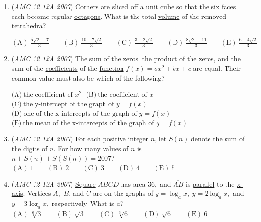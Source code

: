 \begin{enumerate}
 $\mathrm{(A)}\ 282 \qquad \mathrm{(B)}\ 300 \qquad \mathrm{(C)}\ 600 \qquad \mathrm{(D)}\ 900 \qquad \mathrm{(E)}\ 1200$


	\item (\textit{AMC 12 12A 2007}) Corners are sliced off a \href{https://artofproblemsolving.com/wiki/index.php?title=Unit\_cube}{unit cube} so that the six \href{https://artofproblemsolving.com/wiki/index.php?title=Face}{faces} each become regular \href{https://artofproblemsolving.com/wiki/index.php?title=Octagon}{octagons}. What is the total \href{https://artofproblemsolving.com/wiki/index.php?title=Volume}{volume} of the removed \href{https://artofproblemsolving.com/wiki/index.php?title=Tetrahedra}{tetrahedra}?


 $\mathrm{(A)}\ \frac{5\sqrt{2}-7}{3}\qquad \mathrm{(B)}\ \frac{10-7\sqrt{2}}{3}\qquad \mathrm{(C)}\ \frac{3-2\sqrt{2}}{3}\qquad \mathrm{(D)}\ \frac{8\sqrt{2}-11}{3}\qquad \mathrm{(E)}\ \frac{6-4\sqrt{2}}{3}$


	\item (\textit{AMC 12 12A 2007}) The sum of the \href{https://artofproblemsolving.com/wiki/index.php?title=Root}{zeros}, the product of the zeros, and the sum of the \href{https://artofproblemsolving.com/wiki/index.php?title=Coefficient}{coefficients} of the \href{https://artofproblemsolving.com/wiki/index.php?title=Function}{function} $f(x)=ax^{2}+bx+c$ are equal. Their common value must also be which of the following? 


 $\textrm{(A)}\ \textrm{the\ coefficient\ of\ }x^{2}~~~ \textrm{(B)}\ \textrm{the\ coefficient\ of\ }x$
$\textrm{(C)}\ \textrm{the\ y-intercept\ of\ the\ graph\ of\ }y=f(x)$
$\textrm{(D)}\ \textrm{one\ of\ the\ x-intercepts\ of\ the\ graph\ of\ }y=f(x)$
$\textrm{(E)}\ \textrm{the\ mean\ of\ the\ x-intercepts\ of\ the\ graph\ of\ }y=f(x)$


	\item (\textit{AMC 12 12A 2007}) For each positive integer $n$, let $S(n)$ denote the sum of the digits of $n.$ For how many values of $n$ is $n + S(n) + S(S(n)) = 2007?$
$\mathrm{(A)}\ 1 \qquad \mathrm{(B)}\ 2 \qquad \mathrm{(C)}\ 3 \qquad \mathrm{(D)}\ 4 \qquad \mathrm{(E)}\ 5$


	\item (\textit{AMC 12 12A 2007}) \href{https://artofproblemsolving.com/wiki/index.php?title=Square}{Square} $ABCD$ has area $36,$ and $\overline{AB}$ is \href{https://artofproblemsolving.com/wiki/index.php?title=Parallel}{parallel} to the \href{https://artofproblemsolving.com/wiki/index.php?title=X-axis}{x-axis}. Vertices $A,$ $B$, and $C$ are on the graphs of $y = \log_{a}x,$ $y = 2\log_{a}x,$ and $y = 3\log_{a}x,$ respectively. What is $a?$
$\mathrm{(A)}\ \sqrt [6]{3}\qquad \mathrm{(B)}\ \sqrt {3}\qquad \mathrm{(C)}\ \sqrt [3]{6}\qquad \mathrm{(D)}\ \sqrt {6}\qquad \mathrm{(E)}\ 6$



\end{enumerate}
